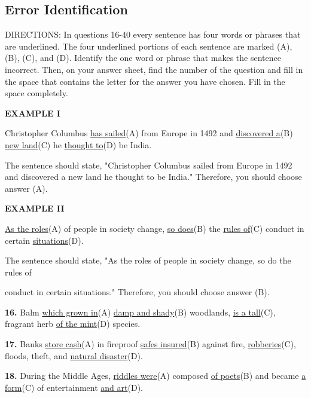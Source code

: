 \documentclass[12pt]{article}
\begin{document}
\subsection*{Error Identification}
DIRECTIONS: In questions 16-40 every sentence has four words or phrases that are underlined. The four underlined portions of each sentence are marked (A), (B), (C), and (D). Identify the one word or phrase that makes the sentence incorrect. Then, on your answer sheet, find the number of the question and fill in the space that contains the letter for the answer you have chosen. Fill in the space completely.\par
\begin{exampleblock}
\textbf{EXAMPLE I}\par
Christopher Columbus \uline{has sailed}(A) from Europe in 1492 and \uline{discovered a}(B) \uline{new land}(C) he \uline{thought to}(D) be India.\par
The sentence should state, "Christopher Columbus sailed from Europe in 1492 and discovered a new land he thought to be India." Therefore, you should choose answer (A).\par
\end{exampleblock}
\begin{exampleblock}
\textbf{EXAMPLE II}\par
\uline{As the roles}(A) of people in society change, \uline{so does}(B) the \uline{rules of}(C) conduct in certain \uline{situations}(D).\par
The sentence should state, "As the roles of people in society change, so do the rules of\par
conduct in certain situations." Therefore, you should choose answer (B).\par
\end{exampleblock}
\noindent\textbf{16.} Balm \uline{which grown in}(A) \uline{damp and shady}(B) woodlands, \uline{is a tall}(C), fragrant herb \uline{of the mint}(D) species.
\par
\vspace{\questionblockgap}
\noindent\textbf{17.} Banks \uline{store cash}(A) in fireproof \uline{safes insured}(B) against fire, \uline{robberies}(C), floods, theft, and \uline{natural disaster}(D).
\par
\vspace{\questionblockgap}
\noindent\textbf{18.} During the Middle Ages, \uline{riddles were}(A) composed \uline{of poets}(B) and became \uline{a form}(C) of entertainment \uline{and art}(D).
\par
\end{document}
